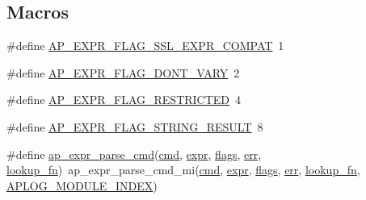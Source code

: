 \subsection*{Macros}
\begin{DoxyCompactItemize}
\item 
\#define \hyperlink{group__AP__EXPR_ga7ef4619dbf6564cf00390a193de2f499}{A\+P\+\_\+\+E\+X\+P\+R\+\_\+\+F\+L\+A\+G\+\_\+\+S\+S\+L\+\_\+\+E\+X\+P\+R\+\_\+\+C\+O\+M\+P\+AT}~1
\item 
\#define \hyperlink{group__AP__EXPR_ga2b831a2e84340ada00100fa078dce1ed}{A\+P\+\_\+\+E\+X\+P\+R\+\_\+\+F\+L\+A\+G\+\_\+\+D\+O\+N\+T\+\_\+\+V\+A\+RY}~2
\item 
\#define \hyperlink{group__AP__EXPR_ga992f5ac0eb18743bdc13fd27d6911755}{A\+P\+\_\+\+E\+X\+P\+R\+\_\+\+F\+L\+A\+G\+\_\+\+R\+E\+S\+T\+R\+I\+C\+T\+ED}~4
\item 
\#define \hyperlink{group__AP__EXPR_ga2f6ad8c0e92760015d2792258baed049}{A\+P\+\_\+\+E\+X\+P\+R\+\_\+\+F\+L\+A\+G\+\_\+\+S\+T\+R\+I\+N\+G\+\_\+\+R\+E\+S\+U\+LT}~8
\item 
\#define \hyperlink{group__AP__EXPR_ga5e9970d44486a68f4805986f5b2b5f7b}{ap\+\_\+expr\+\_\+parse\+\_\+cmd}(\hyperlink{group__apr__thread__proc_ga7b715f5a87a71c6766684c1798251237}{cmd},  \hyperlink{group__AP__EXPR_ga678330dc2f7e5114b38824a310f676ed}{expr},  \hyperlink{pcre_8txt_ad7a10cd81a384ff727296d05bb827806}{flags},  \hyperlink{group__apr__thread__proc_ga156fcecee9d33dd7b55c3d8fdaba7159}{err},  \hyperlink{group__AP__EXPR_ga93d947e1eae744a3ca2acd84e9133f45}{lookup\+\_\+fn})~ap\+\_\+expr\+\_\+parse\+\_\+cmd\+\_\+mi(\hyperlink{group__apr__thread__proc_ga7b715f5a87a71c6766684c1798251237}{cmd}, \hyperlink{group__AP__EXPR_ga678330dc2f7e5114b38824a310f676ed}{expr}, \hyperlink{pcre_8txt_ad7a10cd81a384ff727296d05bb827806}{flags}, \hyperlink{group__apr__thread__proc_ga156fcecee9d33dd7b55c3d8fdaba7159}{err}, \hyperlink{group__AP__EXPR_ga93d947e1eae744a3ca2acd84e9133f45}{lookup\+\_\+fn}, \hyperlink{vhost_8c_ae75325996d1b2cf6120dded4cb153a22}{A\+P\+L\+O\+G\+\_\+\+M\+O\+D\+U\+L\+E\+\_\+\+I\+N\+D\+EX})
\end{DoxyCompactItemize}
